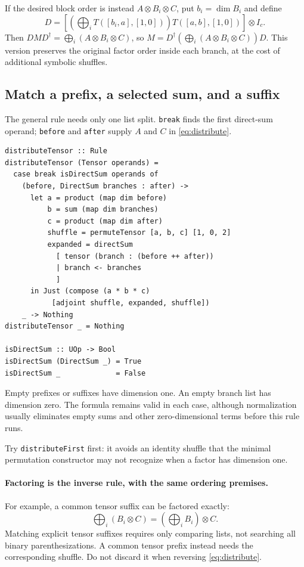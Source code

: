 \documentclass[11pt,a4paper]{article}
\newcommand{\code}[1]{\texttt{#1}}
\begin{document}
If the desired block order is instead $A\otimes B_i\otimes C$, put
$b_i=\dim B_i$ and define
\[
 D=\left[\left(\bigoplus_i T([b_i,a],[1,0])\right)
               T([a,b],[1,0])\right]\otimes I_c.
\]
Then $DMD^\dagger=\bigoplus_i(A\otimes B_i\otimes C)$, so
$M=D^\dagger(\bigoplus_i(A\otimes B_i\otimes C))D$.
This version preserves the original factor order inside each branch,
at the cost of additional symbolic shuffles.

\subsection{Match a prefix, a selected sum, and a suffix}

The general rule needs only one list split. \code{break} finds the
first direct-sum operand; \code{before} and \code{after} supply $A$
and $C$ in \eqref{eq:distribute}.

\begin{lstlisting}
distributeTensor :: Rule
distributeTensor (Tensor operands) =
  case break isDirectSum operands of
    (before, DirectSum branches : after) ->
      let a = product (map dim before)
          b = sum (map dim branches)
          c = product (map dim after)
          shuffle = permuteTensor [a, b, c] [1, 0, 2]
          expanded = directSum
            [ tensor (branch : (before ++ after))
            | branch <- branches
            ]
      in Just (compose (a * b * c)
           [adjoint shuffle, expanded, shuffle])
    _ -> Nothing
distributeTensor _ = Nothing

isDirectSum :: UOp -> Bool
isDirectSum (DirectSum _) = True
isDirectSum _             = False
\end{lstlisting}

Empty prefixes or suffixes have dimension one. An empty branch list
has dimension zero. The formula remains valid in each case, although
normalization usually eliminates empty sums and other zero-dimensional
terms before this rule runs.

Try \code{distributeFirst} first: it avoids an identity shuffle that
the minimal permutation constructor may not recognize when a factor
has dimension one.

\paragraph{Factoring is the inverse rule, with the same ordering premises.}
For example, a common tensor suffix can be factored exactly:
\[
 \bigoplus_i(B_i\otimes C)
   =\left(\bigoplus_i B_i\right)\otimes C.
\]
Matching explicit tensor suffixes requires only comparing lists, not
searching all binary parenthesizations. A common tensor prefix instead
needs the corresponding shuffle. Do not discard it when reversing
\eqref{eq:distribute}.
\end{document}
